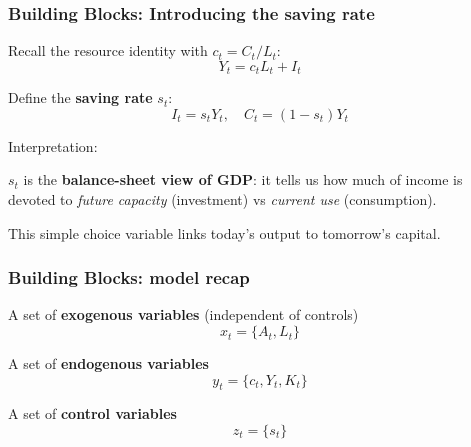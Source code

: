 \documentclass[xcolor=x11names,compress,aspectratio=169]{beamer}%
\makeatletter
\renewenvironment{itemize}{\begin{compactitemize}[<+-| alert@+>]}{\end{compactitemize}}
\makeatother
\begin{document}
\begin{frame}%
%

\frametitle{Building Blocks: Introducing the saving rate}%


\begin{itemize}
\item Recall the resource identity with $c_{t}=C_{t}/L_{t}$:
\[
Y_{t}=c_{t}L_{t}+I_{t}%
\]
\vspace{0.3cm}

\item Define the \textbf{saving rate} $s_{t}$:
\[
I_{t} = s_{t} Y_{t}, \quad C_{t} = (1-s_{t}) Y_{t}
\]
\vspace{0.3cm}

\item Interpretation:

\begin{itemize}
\item $s_{t}$ is the \textbf{balance-sheet view of GDP}: it tells us how much
of income is devoted to \emph{future capacity} (investment) vs \emph{current
use} (consumption).

\item This simple choice variable links today's output to tomorrow's capital.
\end{itemize}
\end{itemize}

%

\transboxout
\end{frame}%
%

\begin{frame}%
%

\frametitle{Building Blocks: model recap}%


\begin{itemize}
\item A set of \textbf{exogenous variables} (independent of controls)%
\[
x_{t}=\{A_{t},L_{t}\}
\]


\item A set of \textbf{endogenous variables}%
\[
y_{t}=\{c_{t},Y_{t},K_{t}\}
\]


\item A set of \textbf{control variables}%
\[
z_{t}=\{s_{t}\}
\]

\end{itemize}

%

\transboxout
\end{frame}%
\end{document}
